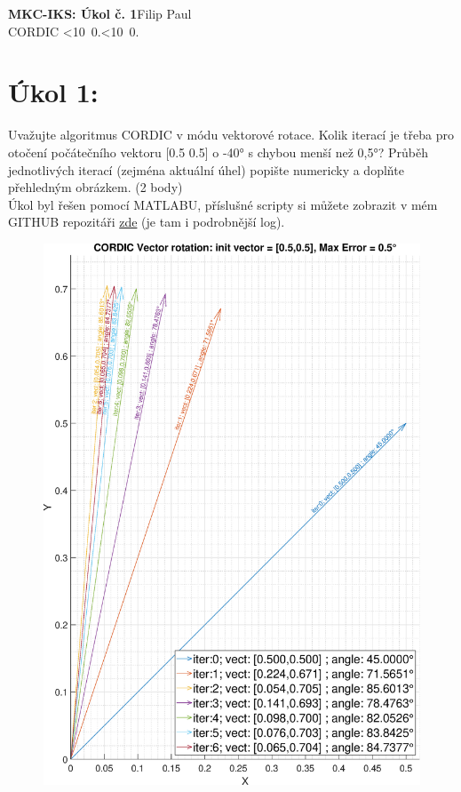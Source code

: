 \documentclass[10pt, a4paper]{article}%
\def\mydate{\leavevmode\hbox{\twodigits\day.\twodigits\month.\the\year}}
\def\twodigits#1{\ifnum#1<10 0\fi\the#1}
\begin{document}
\begin{flushleft}%
	\textbf{\Large{MKC-IKS: Úkol č. 1}}\hfill Filip Paul\\
	\large{CORDIC \hfill\mydate}
\end{flushleft}


	\section{\Large Úkol 1:}
		Uvažujte algoritmus CORDIC v módu vektorové rotace. Kolik iterací je třeba pro otočení počátečního vektoru [0.5  0.5]
		o -40° s chybou menší než 0,5°? Průběh jednotlivých iterací (zejména aktuální úhel) popište numericky a doplňte přehledným obrázkem. (2 body)\\
		Úkol byl řešen pomocí MATLABU, příslušné scripty si můžete zobrazit v mém GITHUB repozitáři 
		\href{https://github.com/FilipPaul/ctvrtak_letni_semestr/blob/main/MKC_IKS/ukol_1_CORDIC/README.md}{\color{blue} zde} (je tam i podrobnější log).
	\begin{figure}[ht!]
		\centering
		\includegraphics[height = 0.80\textheight]{CORDIC_vect_rot.eps}
		
	\end{figure}
	\clearpage
\end{document}

